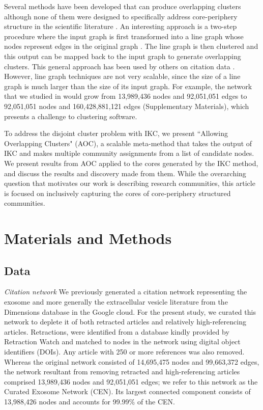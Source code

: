 \documentclass[12pt, oneside]{article}   	%
\begin{document}
Several methods have been developed that can produce overlapping clusters although none of them were designed to specifically address core-periphery structure in the scientific literature  \citep{Baumes2005,Palla2005,banerjee2005model,Cleuziou2008,Lancichinetti2009,Lu2012}. An interesting approach is a two-step procedure where the input graph is first transformed into a line graph whose nodes represent edges in the original graph \citep{Harary1960}.  The line graph is then clustered and this output can be mapped back to the input graph to generate overlapping clusters. This general approach has been used by others on citation data \citep{Evans2009,Havemann2021}. However, line graph  techniques are not very scalable, since the size of a line graph is much larger than the size of its input graph. For example, the network that we studied in \cite{Wedell2022} would grow from 13,989,436 nodes and 92,051,051 edges to 92,051,051 nodes and 160,428,881,121 edges (Supplementary Materials), which presents a challenge to clustering software.
 
To address the disjoint cluster problem with IKC, we present ``Allowing Overlapping Clusters" (AOC), a scalable meta-method that takes the output of IKC and makes multiple community assignments from a list of candidate nodes. We present results from AOC applied to the cores generated by the IKC method, and discuss the results and discovery made from them. While the overarching question that motivates our work is describing research communities, this article is focused on 
inclusively capturing the cores of core-periphery structured communities. 
 
\section{Materials and Methods}

\subsection{Data} 

\emph{Citation network} We previously generated a citation network \citep{Wedell2022} representing the exosome \citep{harding1983} and more generally the extracellular vesicle literature \citep{raposo2021} from the Dimensions database \citep{hook2018dimensions} in the Google cloud. For the present study, we curated this network to deplete it of both retracted articles and relatively high-referencing articles. Retractions, were identified from a database kindly provided by Retraction Watch and matched to nodes in the network using digital object identifiers (DOIs). Any article with 250 or more references was also removed. Whereas the original network consisted of 14,695,475 nodes and 99,663,372 edges, the network resultant from removing retracted and high-referencing articles comprised 13,989,436 nodes and 92,051,051 edges; we refer to this network as   the Curated Exosome Network (CEN). Its largest connected component consists of 13,988,426 nodes and accounts for 99.99\% of the CEN.
\end{document}
